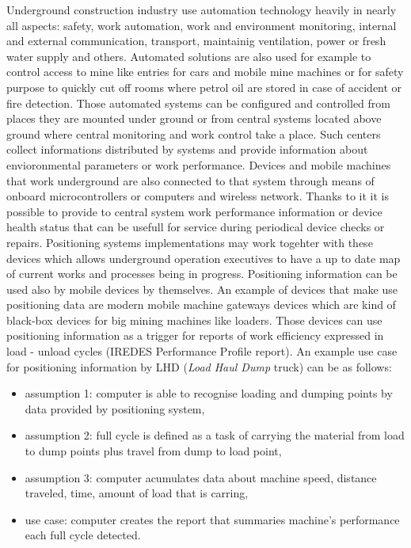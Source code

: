 \documentclass[../main.tex]{subfiles}
\begin{document}
Underground construction industry use automation technology heavily in nearly all aspects: safety, work automation, work and environment monitoring, internal and external communication, transport, maintainig ventilation, power or fresh water supply and others. Automated solutions are also used for example to control access to mine like entries for cars and mobile mine machines or for safety purpose to quickly cut off rooms where petrol oil are stored in case of accident or fire detection. Those automated systems can be configured and controlled from places they are mounted under ground or from central systems located above ground where central monitoring and work control take a place. Such centers collect informations distributed by systems and provide information about envioronmental parameters or work performance. Devices and mobile machines that work underground are also connected to that system through means of onboard microcontrollers or computers and wireless network. Thanks to it it is possible to provide to central system work performance information or device health status that can be usefull for service during periodical device checks or repairs. Positioning systems implementations may work togehter with these devices which allows underground operation executives to have a up to date map of current works and processes being in progress. Positioning information can be used also by mobile devices by themselves. An example of devices that make use positioning data are modern mobile machine gateways devices \cite{Thesis_CM} which are kind of black-box devices for big mining machines like loaders. Those devices can use positioning information as a trigger for reports of work efficiency expressed in load - unload cycles (IREDES Performance Profile report)\cite{article_mine_monitoring_architecture}. An example use case for positioning information by LHD (\textit{Load Haul Dump} truck) can be as follows:
\begin{itemize}
	\item assumption 1: computer is able to recognise loading and dumping points by data provided by positioning system,
	\item assumption 2: full cycle is defined as a task of carrying the material from load to dump points plus travel from dump to load point,
	\item assumption 3: computer acumulates data about machine speed, distance traveled, time, amount of load that is carring,
	\item use case: computer creates the report that summaries machine's performance each full cycle detected.
\end{itemize}
\end{document}
